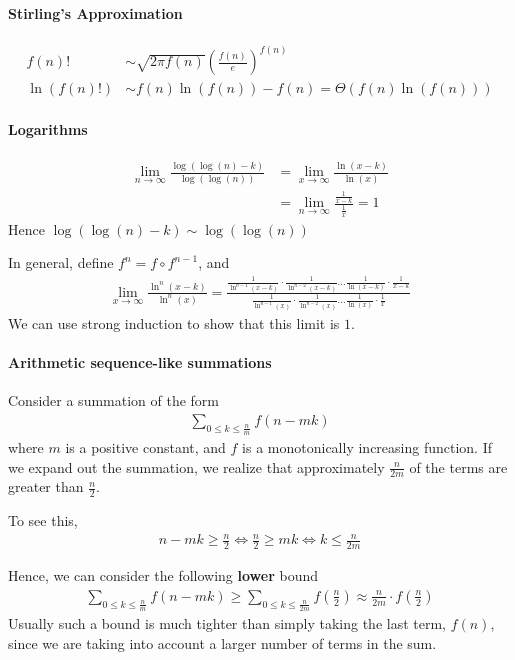 \documentclass{article}
\begin{document}
\paragraph{Stirling's Approximation}
\begin{align*}
	f(n)!&\sim \sqrt{2\pi f(n)}\left(\frac{f(n)}{e}\right)^{f(n)}\\
	\ln(f(n)!)&\sim f(n)\ln(f(n)) - f(n) = \Theta(f(n)\ln(f(n)))
\end{align*}


\paragraph{Logarithms}
\begin{align*}
	\lim_{n\rightarrow \infty}\frac{\log(\log(n)-k)}{\log(\log(n))} &= \lim_{x\rightarrow \infty}\frac{\ln(x-k)}{\ln(x)}\\
	&= \lim_{n\rightarrow \infty}\frac{\frac{1}{x-k}}{\frac{1}{x}}=1
\end{align*}
Hence $\log(\log(n)-k)\sim \log(\log(n))$


In general, define $f^n=f\circ f^{n-1}$, and
\begin{align*}
	\lim_{x\rightarrow \infty} \frac{\ln^n(x-k)}{\ln^n(x)} = \frac{\frac{1}{\ln^{n-1}(x-k)}\cdot\frac{1}{\ln^{n-2}(x-k)}\dots \frac{1}{\ln(x-k)}\cdot \frac{1}{x-k}}{\frac{1}{\ln^{n-1}(x)}\cdot\frac{1}{\ln^{n-2}(x)}\dots \frac{1}{\ln(x)}\cdot \frac{1}{x}}
\end{align*}
We can use strong induction to show that this limit is $1$.

\paragraph{Arithmetic sequence-like summations}
Consider a summation of the form
\begin{align*}
	\sum_{0\leq k\leq \frac{n}{m}}f(n-mk)
\end{align*}
where $m$ is a positive constant, and $f$ is a monotonically increasing function. If we expand out the summation, we realize that approximately $\frac{n}{2m}$ of the terms are greater than $\frac{n}{2}$.

To see this,
\begin{align*}
	n-mk\geq \frac{n}{2}\iff \frac{n}{2}\geq mk\iff k\leq \frac{n}{2m}
\end{align*}

Hence, we can consider the following \textbf{lower} bound
\begin{align*}
	\sum_{0\leq k\leq \frac{n}{m}}f(n-mk) \geq \sum_{0\leq k\leq \frac{n}{2m}}f(\frac{n}{2}) \approx \frac{n}{2m}\cdot f(\frac{n}{2})
\end{align*}
Usually such a bound is much tighter than simply taking the last term, $f(n)$, since we are taking into account a larger number of terms in the sum.
\end{document}
